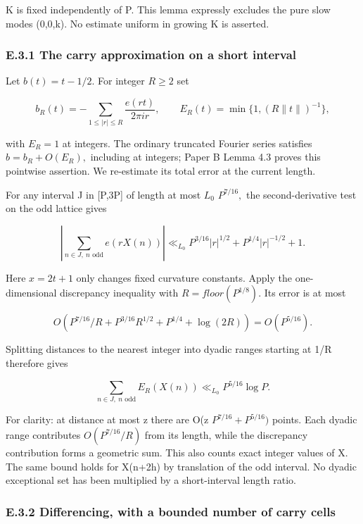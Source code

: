 \documentclass[11pt,a4paper]{article}
\begin{document}
K is fixed independently of P. This lemma expressly excludes the pure
slow modes (0,0,k). No estimate uniform in growing K is asserted.

\subsubsection{E.3.1 The carry approximation on a short
interval}\label{e.3.1-the-carry-approximation-on-a-short-interval}

Let \(b(t)={t}-1/2.\) For integer \(R\ge 2\) set

\[
 b_R(t)=-\sum_{1\le|r|\le R}\frac{e(rt)}{2\pi i r},\qquad
 E_R(t)=\min\{1,(R\|t\|)^{-1}\},
\]

with \(E_R=1\) at integers. The ordinary truncated Fourier series
satisfies \(b=b_R+O(E_R),\) including at integers; Paper B Lemma 4.3
proves this pointwise assertion. We re-estimate its total error at the
current length.

For any interval J in {[}P,3P{]} of length at most \(L_0\) \(P^{7/16},\)
the second-derivative test on the odd lattice gives

\[
 \left|\sum_{n\in J,\ n\text{ odd}} e(rX(n))\right|
 \ll_{L_0} P^{3/16}|r|^{1/2}+P^{1/4}|r|^{-1/2}+1.
 \tag{E.6}
\]

Here \(x=2t+1\) only changes fixed curvature constants. Apply the
one-dimensional discrepancy inequality with \(R=floor(P^{1/8}).\) Its
error is at most

\[
 O\left(P^{7/16}/R+P^{3/16}R^{1/2}+P^{1/4}+\log(2R)\right)
       =O(P^{5/16}).
\]

Splitting distances to the nearest integer into dyadic ranges starting
at 1/R therefore gives

\[
 \sum_{n\in J,\ n\text{ odd}} E_R(X(n))
          \ll_{L_0} P^{5/16}\log P.
 \tag{E.7}
\]

For clarity: at distance at most z there are O(z \(P^{7/16}+P^{5/16})\)
points. Each dyadic range contributes \(O(P^{7/16}/R)\) from its length,
while the discrepancy contribution forms a geometric sum. This also
counts exact integer values of X. The same bound holds for X(n+2h) by
translation of the odd interval. No dyadic exceptional set has been
multiplied by a short-interval length ratio.

\subsubsection{E.3.2 Differencing, with a bounded number of carry
cells}\label{e.3.2-differencing-with-a-bounded-number-of-carry-cells}
\end{document}
